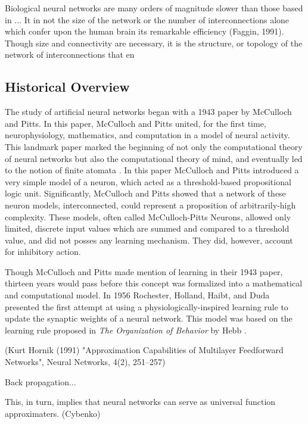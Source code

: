 \documentclass[11pt]{afthesis}
\begin{document}
Biological neural networks are many orders of magnitude slower than those based in ... It in not the size of the network or the number of interconnections alone which confer upon the human brain its remarkable efficiency (Faggin, 1991). Though size and connectivity are necessary, it is the structure, or topology of the network of interconnections that en


\subsection{Historical Overview}

The study of artificial neural networks began with a 1943 paper \cite{mcculloch1988} by McCulloch and Pitts. In this paper, McCulloch and Pitts united, for the first time, neurophysiology, mathematics, and computation in a model of neural activity. This landmark paper marked the beginning of not only the computational theory of neural networks but also the computational theory of mind, and eventually led to the notion of finite atomata \cite{piccinini2006}. In this paper McCulloch and Pitts introduced a very simple model of a neuron, which acted as a threshold-based propositional logic unit. Significantly, McCulloch and Pitts showed that a network of these neuron models, interconnected, could represent a proposition of arbitrarily-high complexity. These models, often called McCulloch-Pitts Neurons, allowed only limited, discrete input values which are summed and compared to a threshold value, and did not posses any learning mechanism. They did, however, account for inhibitory action. 

Though McCulloch and Pitts made mention of learning in their 1943 paper, thirteen years would pass before this concept was formalized into a mathematical and computational model. In 1956 Rochester, Holland, Haibt, and Duda \cite{rochester1956} presented the first attempt at using a physiologically-inspired learning rule to update the synaptic weights of a neural network. This model was based on the learning rule proposed in \textit{The Organization of Behavior} by Hebb \cite{hebb1967}.



(Kurt Hornik (1991) "Approximation Capabilities of Multilayer Feedforward Networks", Neural Networks, 4(2), 251–257)

Back propagation... 

This, in turn, implies that neural networks can serve as universal function approximaters. (Cybenko)
\end{document}
